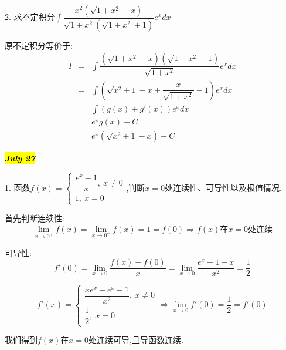 2. 求不定积分$\int\dfrac{x^2(\sqrt{1+x^2}-x)}{\sqrt{1+x^2}(\sqrt{1+x^2}+1)}e^{x}dx$
\begin{solution}
	
	原不定积分等价于: 
	\begin{eqnarray*}
		I&=&\int\dfrac{(\sqrt{1+x^2}-x)(\sqrt{1+x^2}+1)}{\sqrt{1+x^2}}e^xdx\\
		&=&\int(\sqrt{x^2+1}-x+\dfrac{x}{\sqrt{1+x^2}}-1)e^xdx\\
		&=&\int(g(x)+g'(x))e^xdx\\
		&=&e^xg(x)+C\\
		&=&e^x(\sqrt{x^2+1}-x)+C
	\end{eqnarray*}
\end{solution}

\hl{\textbf{\textit{July 27}}}

1. 函数$f(x)=\left\lbrace
\begin{array}{l}
	\dfrac{e^x-1}{x},\ x\neq 0\\
	1,\ x=0
\end{array}
\right. $,判断$x=0$处连续性、可导性以及极值情况.
\begin{solution}
	
	首先判断连续性: $$\lim\limits_{x\rightarrow 0^{+}}f(x)=\lim\limits_{x\rightarrow 0^{-}}f(x)=1=f(0)\Rightarrow f(x)\text{在}x=0\text{处连续}$$
	
	可导性: 
	$$f'(0)=\lim\limits_{x\rightarrow 0}\dfrac{f(x)-f(0)}{x}=\lim\limits_{x\rightarrow 0}\dfrac{e^x-1-x}{x^2}=\dfrac{1}{2}$$
	
	$$f'(x)=\left\lbrace
	\begin{array}{l}
		\dfrac{xe^x-e^x+1}{x^2},\ x\neq 0\\
		\dfrac{1}{2},\ x=0
	\end{array}
	\right. \Rightarrow \lim\limits_{x\rightarrow 0}f'(0)=\dfrac{1}{2}=f'(0)$$
	
	我们得到$f(x)$在$x=0$处连续可导,且导函数连续.
\end{solution}

